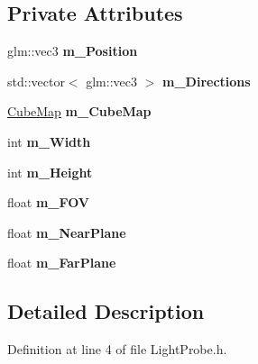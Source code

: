 \subsection*{Private Attributes}
\begin{DoxyCompactItemize}
\item 
glm\+::vec3 {\bfseries m\+\_\+\+Position}\hypertarget{class_light_probe_aef07e749e06e4cb487cf5d506bcf409f}{}\label{class_light_probe_aef07e749e06e4cb487cf5d506bcf409f}

\item 
std\+::vector$<$ glm\+::vec3 $>$ {\bfseries m\+\_\+\+Directions}\hypertarget{class_light_probe_a12a6979a462e9c38b180bd9b6892e64c}{}\label{class_light_probe_a12a6979a462e9c38b180bd9b6892e64c}

\item 
\hyperlink{class_cube_map}{Cube\+Map} {\bfseries m\+\_\+\+Cube\+Map}\hypertarget{class_light_probe_ad02108a065ff3f69e3f8627f1c6b310c}{}\label{class_light_probe_ad02108a065ff3f69e3f8627f1c6b310c}

\item 
int {\bfseries m\+\_\+\+Width}\hypertarget{class_light_probe_adc924471ef4d109a6f3e29a4094febda}{}\label{class_light_probe_adc924471ef4d109a6f3e29a4094febda}

\item 
int {\bfseries m\+\_\+\+Height}\hypertarget{class_light_probe_a9803b3b1f5b67785ef6e1079ae692d04}{}\label{class_light_probe_a9803b3b1f5b67785ef6e1079ae692d04}

\item 
float {\bfseries m\+\_\+\+F\+OV}\hypertarget{class_light_probe_a33b1d5d8fef7493f59a1b1d13888eeca}{}\label{class_light_probe_a33b1d5d8fef7493f59a1b1d13888eeca}

\item 
float {\bfseries m\+\_\+\+Near\+Plane}\hypertarget{class_light_probe_aa38ec97383e8d28407fb37806ab7a6b6}{}\label{class_light_probe_aa38ec97383e8d28407fb37806ab7a6b6}

\item 
float {\bfseries m\+\_\+\+Far\+Plane}\hypertarget{class_light_probe_a1bb6fc7fac3b49426a93bc8f9ca43a56}{}\label{class_light_probe_a1bb6fc7fac3b49426a93bc8f9ca43a56}

\end{DoxyCompactItemize}


\subsection{Detailed Description}


Definition at line 4 of file Light\+Probe.\+h.

